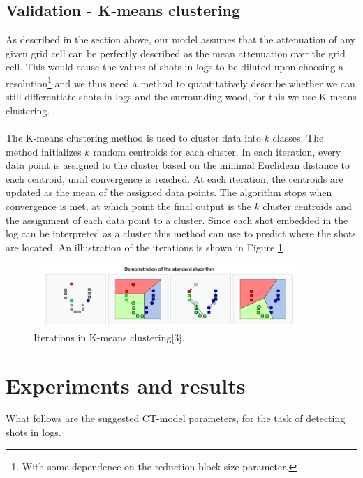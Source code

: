 \documentclass{article}
\begin{document}
\subsection{Validation - K-means clustering}
As described in the section above, our model assumes that the attenuation of any given grid cell can be perfectly described as the mean attenuation over the grid cell. This would cause the values of shots in logs to be diluted upon choosing a resolution\footnote{With some dependence on the reduction block size parameter.} and we thus need a method to quantitatively describe whether we can still differentiate shots in logs and the surrounding wood, for this we use K-means clustering. \\\\
The K-means clustering method is used to cluster data into $k$ classes. The method initializes $k$ random centroids for each cluster. In each iteration, every data point is assigned to the cluster based on the minimal Euclidean distance to each centroid, until convergence is reached. At each iteration, the centroids are updated as the mean of the assigned data points. The algorithm stops when convergence is met, at which point the final output is the $k$ cluster centroids and the assignment of each data point to a cluster. Since each shot embedded in the log can be interpreted as a cluster this method can use to predict where the shots are located. An illustration of the iterations is shown in Figure \ref{Kmeans}. 
\begin{figure}[H]
    \centering
    \includegraphics[width=10cm]{images/Kmeans.png}
    \caption[Iterations in K-means clustering]{\small Iterations in K-means clustering[3].}
    \label{Kmeans}
\end{figure}


\section{Experiments and results}
\vspace*{-0.3\baselineskip}
What follows are the suggested CT-model parameters, for the task of detecting shots in logs. 
\end{document}

